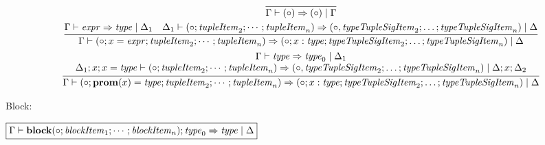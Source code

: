 \begin{gather*}
  \infer{\Gamma \vdash (\circ) \Rightarrow (\circ) \mid \Gamma}{}
  \\
  \infer{\Gamma \vdash (\circ; x = \mathit{expr}; \mathit{tupleItem}_2; \cdots; \mathit{tupleItem}_n) \Rightarrow (\circ; x: \mathit{type}; \mathit{typeTupleSigItem}_2; \ldots; \mathit{typeTupleSigItem}_n) \mid \Delta}{
    \Gamma \vdash \mathit{expr} \Rightarrow \mathit{type} \mid \Delta_1
    &
    \Delta_1 \vdash (\circ; \mathit{tupleItem}_2; \cdots; \mathit{tupleItem}_n) \Rightarrow (\circ, \mathit{typeTupleSigItem}_2; \ldots; \mathit{typeTupleSigItem}_n) \mid \Delta
  }
  \\
  \infer{\Gamma \vdash (\circ; \mathbf{prom}(x) = \mathit{type}; \mathit{tupleItem}_2; \cdots; \mathit{tupleItem}_n) \Rightarrow (\circ; x: \mathit{type}; \mathit{typeTupleSigItem}_2; \ldots; \mathit{typeTupleSigItem}_n) \mid \Delta}{
    \begin{array}{c}
      \Gamma \vdash \mathit{type} \Rightarrow \mathit{type}_0 \mid \Delta_1
      \\
      \Delta_1; x; x = \mathit{type} \vdash (\circ; \mathit{tupleItem}_2; \cdots; \mathit{tupleItem}_n) \Rightarrow (\circ, \mathit{typeTupleSigItem}_2; \ldots; \mathit{typeTupleSigItem}_n) \mid \Delta; x; \Delta_2
    \end{array}
  }
\end{gather*}

Block:

$\fbox{$\Gamma \vdash \mathbf{block}(\circ; \mathit{blockItem}_1; \cdots; \mathit{blockItem}_n); \mathit{type}_0 \Rightarrow \mathit{type} \mid \Delta$}$

